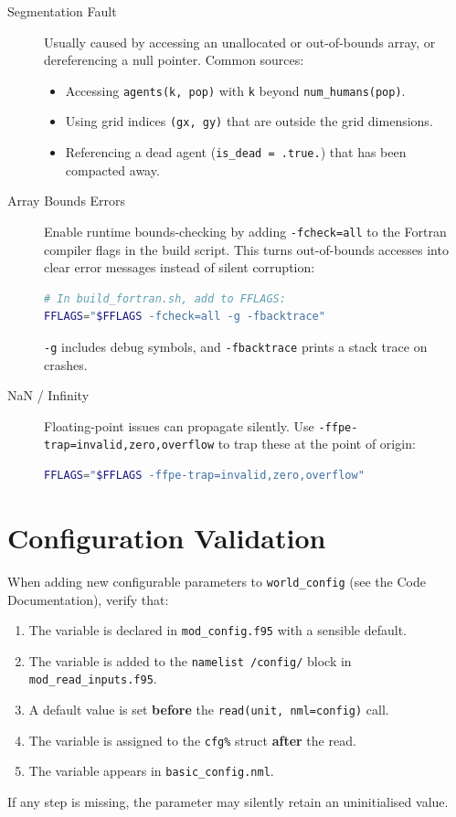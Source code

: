 \documentclass[14pt,a4paper]{extreport}
\begin{document}
\begin{description}
    \item[Segmentation Fault]
    Usually caused by accessing an unallocated or out-of-bounds array, or dereferencing a null pointer.
    Common sources:
    \begin{itemize}
        \item Accessing \texttt{agents(k, pop)} with \texttt{k} beyond \texttt{num\_humans(pop)}.
        \item Using grid indices \texttt{(gx, gy)} that are outside the grid dimensions.
        \item Referencing a dead agent (\texttt{is\_dead = .true.}) that has been compacted away.
    \end{itemize}

    \item[Array Bounds Errors]
    Enable runtime bounds-checking by adding \texttt{-fcheck=all} to the Fortran compiler flags in the build script.
    This turns out-of-bounds accesses into clear error messages instead of silent corruption:
    \begin{lstlisting}[language=bash]
# In build_fortran.sh, add to FFLAGS:
FFLAGS="$FFLAGS -fcheck=all -g -fbacktrace"
    \end{lstlisting}
    \texttt{-g} includes debug symbols, and \texttt{-fbacktrace} prints a stack trace on crashes.

    \item[NaN / Infinity]
    Floating-point issues can propagate silently.
    Use \texttt{-ffpe-trap=invalid,zero,overflow} to trap these at the point of origin:
    \begin{lstlisting}[language=bash]
FFLAGS="$FFLAGS -ffpe-trap=invalid,zero,overflow"
    \end{lstlisting}
\end{description}

\section{Configuration Validation}
When adding new configurable parameters to \texttt{world\_config} (see the Code Documentation), verify that:
\begin{enumerate}
    \item The variable is declared in \texttt{mod\_config.f95} with a sensible default.
    \item The variable is added to the \texttt{namelist /config/} block in \texttt{mod\_read\_inputs.f95}.
    \item A default value is set \textbf{before} the \texttt{read(unit, nml=config)} call.
    \item The variable is assigned to the \texttt{cfg\%} struct \textbf{after} the read.
    \item The variable appears in \texttt{basic\_config.nml}.
\end{enumerate}
If any step is missing, the parameter may silently retain an uninitialised value.
\end{document}
